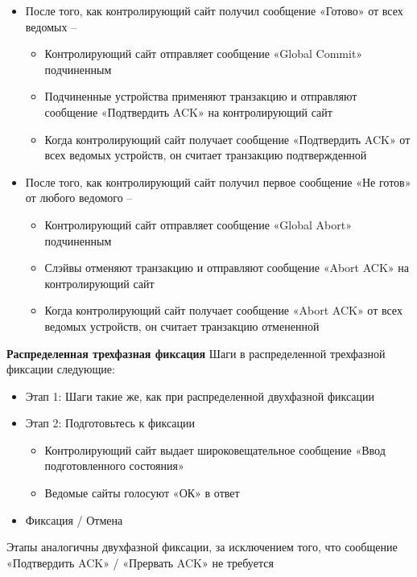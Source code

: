 \begin{itemize}
    \item После того, как контролирующий сайт получил сообщение «Готово» от всех ведомых –
    \begin{itemize}
        \item Контролирующий сайт отправляет сообщение «Global Commit» подчиненным
        \item Подчиненные устройства применяют транзакцию и отправляют сообщение «Подтвердить ACK» на контролирующий сайт
        \item Когда контролирующий сайт получает сообщение «Подтвердить ACK» от всех ведомых
        устройств, он считает транзакцию подтвержденной
    \end{itemize}
    \item После того, как контролирующий сайт получил первое сообщение «Не готов» от любого ведомого –
    \begin{itemize}
        \item Контролирующий сайт отправляет сообщение «Global Abort» подчиненным
        \item Слэйвы отменяют транзакцию и отправляют сообщение «Abort ACK» на контролирующий сайт
        \item Когда контролирующий сайт получает сообщение «Abort ACK» от всех ведомых
        устройств, он считает транзакцию отмененной
    \end{itemize}

\end{itemize}

\bigbreak
\textbf{Распределенная трехфазная фиксация}
Шаги в распределенной трехфазной фиксации следующие:
\begin{itemize}
    \item Этап 1: Шаги такие же, как при распределенной двухфазной фиксации
    \item Этап 2: Подготовьтесь к фиксации
    \begin{itemize}
        \item Контролирующий сайт выдает широковещательное сообщение «Ввод подготовленного состояния»
        \item Ведомые сайты голосуют «ОК» в ответ
    \end{itemize}
    \item Фиксация / Отмена
\end{itemize}

Этапы аналогичны двухфазной фиксации, за исключением того, что сообщение «Подтвердить ACK» / «Прервать ACK» не требуется

